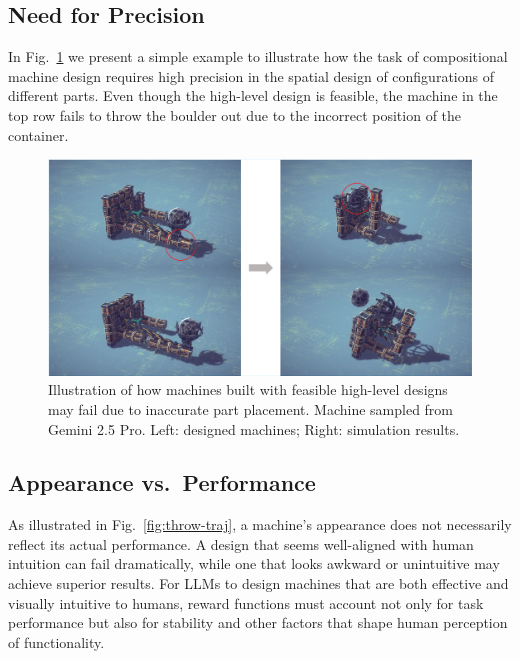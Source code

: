 \subsection{Need for Precision}


In Fig.~\ref{fig:tiny-modify} we present a simple example to illustrate how the task of compositional machine design requires high precision in the spatial design of configurations of different parts. Even though the high-level design is feasible, the machine in the top row fails to throw the boulder out due to the incorrect position of the container.


\begin{figure}[h!]
  \centering
  \includegraphics[width=\linewidth]{figures/tiny_modify_v3_cropped.pdf}
  \caption{\footnotesize Illustration of how machines built with feasible high-level designs may fail due to inaccurate part placement. Machine sampled from Gemini 2.5 Pro. Left: designed machines; Right: simulation results.}
  \label{fig:tiny-modify}
\end{figure}

\subsection{Appearance vs.~Performance}

As illustrated in Fig.~\ref{fig:throw-traj}, a machine's appearance does not necessarily reflect its actual performance. A design that seems well-aligned with human intuition can fail dramatically, while one that looks awkward or unintuitive may achieve superior results. For LLMs to design machines that are both effective and visually intuitive to humans, reward functions must account not only for task performance but also for stability and other factors that shape human perception of functionality.

